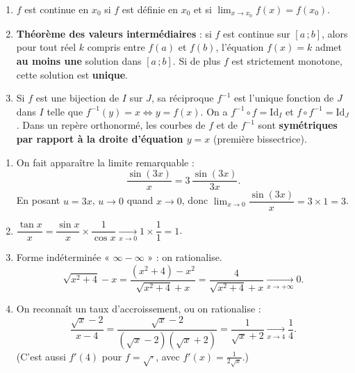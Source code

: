\documentclass[11pt]{article}
\newcommand{\cle}[1]{{\popxbold\color{popdark}#1}}
\newcounter{popsec}
\newcounter{popsub}
\newcommand{\courssub}[1]{%
  \stepcounter{popsub}%
  \par\vspace{9pt}\noindent{\popxbold\fontsize{11.5}{13}\selectfont\color{popink}{\color{poporange}\thepopsec.\thepopsub}\hspace{6pt}#1}\par\nopagebreak\vspace{4pt}
}
\begin{document}
\begin{corrige}
\begin{enumerate}
\item $f$ est \cle{continue en $x_0$} si $f$ est définie en $x_0$ et si $\displaystyle\lim_{x\to x_0}f(x)=f(x_0)$.
\item \textbf{Théorème des valeurs intermédiaires} : si $f$ est continue sur $[a\,;b]$, alors pour tout réel $k$ compris entre $f(a)$ et $f(b)$, l'équation $f(x)=k$ admet \textbf{au moins une} solution dans $[a\,;b]$. Si de plus $f$ est strictement monotone, cette solution est \textbf{unique}.
\item Si $f$ est une bijection de $I$ sur $J$, sa \cle{réciproque} $f^{-1}$ est l'unique fonction de $J$ dans $I$ telle que $f^{-1}(y)=x \iff y=f(x)$. On a $f^{-1}\circ f=\mathrm{Id}_I$ et $f\circ f^{-1}=\mathrm{Id}_J$. Dans un repère orthonormé, les courbes de $f$ et de $f^{-1}$ sont \textbf{symétriques par rapport à la droite d'équation $y=x$} (première bissectrice).
\end{enumerate}
\end{corrige}

\begin{corrige}
\begin{enumerate}
\item On fait apparaître la limite remarquable :
\[\dfrac{\sin(3x)}{x}=3\,\dfrac{\sin(3x)}{3x}.\]
En posant $u=3x$, $u\to 0$ quand $x\to 0$, donc $\displaystyle\lim_{x\to 0}\dfrac{\sin(3x)}{x}=3\times 1=3$.
\item $\dfrac{\tan x}{x}=\dfrac{\sin x}{x}\times\dfrac{1}{\cos x}\xrightarrow[x\to 0]{}1\times\dfrac{1}{1}=1$.
\item Forme indéterminée « $\infty-\infty$ » : on rationalise.
\[\sqrt{x^2+4}-x=\dfrac{(x^2+4)-x^2}{\sqrt{x^2+4}+x}=\dfrac{4}{\sqrt{x^2+4}+x}\xrightarrow[x\to+\infty]{}0.\]
\item On reconnaît un taux d'accroissement, ou on rationalise :
\[\dfrac{\sqrt{x}-2}{x-4}=\dfrac{\sqrt{x}-2}{(\sqrt{x}-2)(\sqrt{x}+2)}=\dfrac{1}{\sqrt{x}+2}\xrightarrow[x\to 4]{}\dfrac{1}{4}.\]
(C'est aussi $f'(4)$ pour $f=\sqrt{\cdot}$, avec $f'(x)=\frac{1}{2\sqrt{x}}$.)
\end{enumerate}
\end{corrige}

\courssub{Je m'entraîne}
\end{document}

